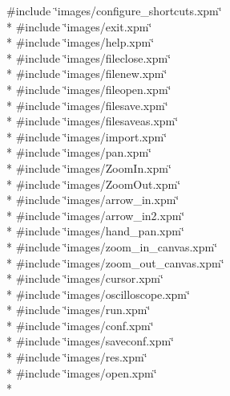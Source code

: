 {\ttfamily \#include \char`\"{}images/configure\+\_\+shortcuts.\+xpm\char`\"{}}\\*
{\ttfamily \#include \char`\"{}images/exit.\+xpm\char`\"{}}\\*
{\ttfamily \#include \char`\"{}images/help.\+xpm\char`\"{}}\\*
{\ttfamily \#include \char`\"{}images/fileclose.\+xpm\char`\"{}}\\*
{\ttfamily \#include \char`\"{}images/filenew.\+xpm\char`\"{}}\\*
{\ttfamily \#include \char`\"{}images/fileopen.\+xpm\char`\"{}}\\*
{\ttfamily \#include \char`\"{}images/filesave.\+xpm\char`\"{}}\\*
{\ttfamily \#include \char`\"{}images/filesaveas.\+xpm\char`\"{}}\\*
{\ttfamily \#include \char`\"{}images/import.\+xpm\char`\"{}}\\*
{\ttfamily \#include \char`\"{}images/pan.\+xpm\char`\"{}}\\*
{\ttfamily \#include \char`\"{}images/\+Zoom\+In.\+xpm\char`\"{}}\\*
{\ttfamily \#include \char`\"{}images/\+Zoom\+Out.\+xpm\char`\"{}}\\*
{\ttfamily \#include \char`\"{}images/arrow\+\_\+in.\+xpm\char`\"{}}\\*
{\ttfamily \#include \char`\"{}images/arrow\+\_\+in2.\+xpm\char`\"{}}\\*
{\ttfamily \#include \char`\"{}images/hand\+\_\+pan.\+xpm\char`\"{}}\\*
{\ttfamily \#include \char`\"{}images/zoom\+\_\+in\+\_\+canvas.\+xpm\char`\"{}}\\*
{\ttfamily \#include \char`\"{}images/zoom\+\_\+out\+\_\+canvas.\+xpm\char`\"{}}\\*
{\ttfamily \#include \char`\"{}images/cursor.\+xpm\char`\"{}}\\*
{\ttfamily \#include \char`\"{}images/oscilloscope.\+xpm\char`\"{}}\\*
{\ttfamily \#include \char`\"{}images/run.\+xpm\char`\"{}}\\*
{\ttfamily \#include \char`\"{}images/conf.\+xpm\char`\"{}}\\*
{\ttfamily \#include \char`\"{}images/saveconf.\+xpm\char`\"{}}\\*
{\ttfamily \#include \char`\"{}images/res.\+xpm\char`\"{}}\\*
{\ttfamily \#include \char`\"{}images/open.\+xpm\char`\"{}}\\*
